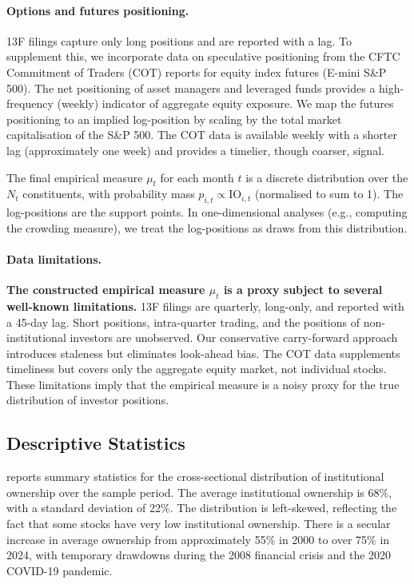 \paragraph{Options and futures positioning.} 13F filings capture only long
positions and are reported with a lag. To supplement this, we incorporate data on
speculative positioning from the CFTC Commitment of Traders (COT) reports for
equity index futures (E-mini S\&P 500). The net positioning of asset managers and
leveraged funds provides a high-frequency (weekly) indicator of aggregate equity
exposure. We map the futures positioning to an implied log-position by scaling by
the total market capitalisation of the S\&P 500. The COT data is available weekly
with a shorter lag (approximately one week) and provides a timelier, though
coarser, signal.

The final empirical measure $\mu_t$ for each month $t$ is a discrete distribution
over the $N_t$ constituents, with probability mass $p_{i,t} \propto \mathrm{IO}_{i,t}$
(normalised to sum to 1). The log-positions are the support points. In
one-dimensional analyses (e.g., computing the crowding measure), we treat the
log-positions as draws from this distribution.

\paragraph{Data limitations.} \textbf{The constructed empirical measure $\mu_t$ is
a proxy subject to several well-known limitations.} 13F filings are quarterly,
long-only, and reported with a 45-day lag. Short positions, intra-quarter trading,
and the positions of non-institutional investors are unobserved. Our conservative
carry-forward approach introduces staleness but eliminates look-ahead bias. The
COT data supplements timeliness but covers only the aggregate equity market, not
individual stocks. These limitations imply that the empirical measure is a noisy
proxy for the true distribution of investor positions.

\subsection{Descriptive Statistics}

 reports summary statistics for the
cross-sectional distribution of institutional ownership over the sample period. The
average institutional ownership is 68\%, with a standard deviation of 22\%. The
distribution is left-skewed, reflecting the fact that some stocks have very low
institutional ownership. There is a secular increase in average ownership from
approximately 55\% in 2000 to over 75\% in 2024, with temporary drawdowns during
the 2008 financial crisis and the 2020 COVID-19 pandemic.

